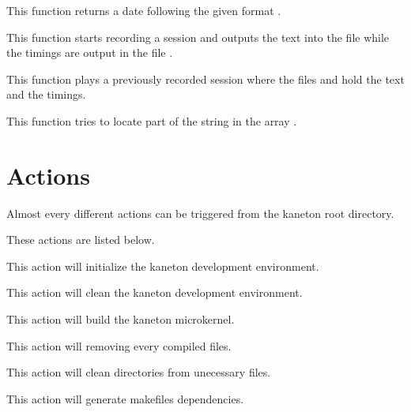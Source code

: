          {
	   This function returns a date following the given format
	   .
	 }

         {
	   This function starts recording a session and outputs
	   the text into the file  while the timings
	   are output in the file .
	 }

         {
	   This function plays a previously recorded session where
	   the files  and  hold the
	   text and the timings.
	 }

         {
	   This function tries to locate part of the string
	    in the array .
	 }

%
%

\section{Actions}

Almost every different actions can be triggered from the kaneton
root directory.

These actions are listed below.

        {
	  This action will initialize the kaneton development environment.

	}

	{
	  This action will clean the kaneton development environment.

	}

	{
	  This action will build the kaneton microkernel.

	}

	{
	  This action will removing every compiled files.

	}

	{
	  This action will clean directories from unecessary files.

	}

	{
	  This action will generate makefiles dependencies.

	}

